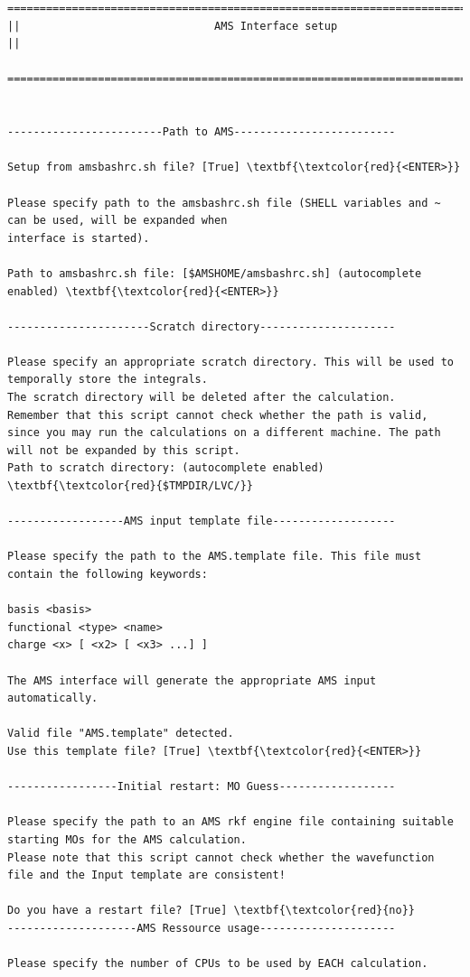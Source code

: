 \documentclass[a4paper,11pt,DIV=15,openany]{scrbook}
\begin{document}
\begin{oframed}
\begin{Verbatim}[commandchars=\\\{\}]
================================================================================
||                              AMS Interface setup                               ||
  ================================================================================


------------------------Path to AMS-------------------------

Setup from amsbashrc.sh file? [True] \textbf{\textcolor{red}{<ENTER>}}

Please specify path to the amsbashrc.sh file (SHELL variables and ~ can be used, will be expanded when 
interface is started).

Path to amsbashrc.sh file: [$AMSHOME/amsbashrc.sh] (autocomplete enabled) \textbf{\textcolor{red}{<ENTER>}}

----------------------Scratch directory---------------------

Please specify an appropriate scratch directory. This will be used to temporally store the integrals. 
The scratch directory will be deleted after the calculation. 
Remember that this script cannot check whether the path is valid, 
since you may run the calculations on a different machine. The path will not be expanded by this script.
Path to scratch directory: (autocomplete enabled) \textbf{\textcolor{red}{$TMPDIR/LVC/}}

------------------AMS input template file-------------------

Please specify the path to the AMS.template file. This file must contain the following keywords:

basis <basis>
functional <type> <name>
charge <x> [ <x2> [ <x3> ...] ]

The AMS interface will generate the appropriate AMS input automatically.

Valid file "AMS.template" detected. 
Use this template file? [True] \textbf{\textcolor{red}{<ENTER>}}

-----------------Initial restart: MO Guess------------------

Please specify the path to an AMS rkf engine file containing suitable starting MOs for the AMS calculation. 
Please note that this script cannot check whether the wavefunction file and the Input template are consistent!

Do you have a restart file? [True] \textbf{\textcolor{red}{no}}
--------------------AMS Ressource usage---------------------

Please specify the number of CPUs to be used by EACH calculation.


\end{Verbatim}
\end{oframed}
\end{document}
